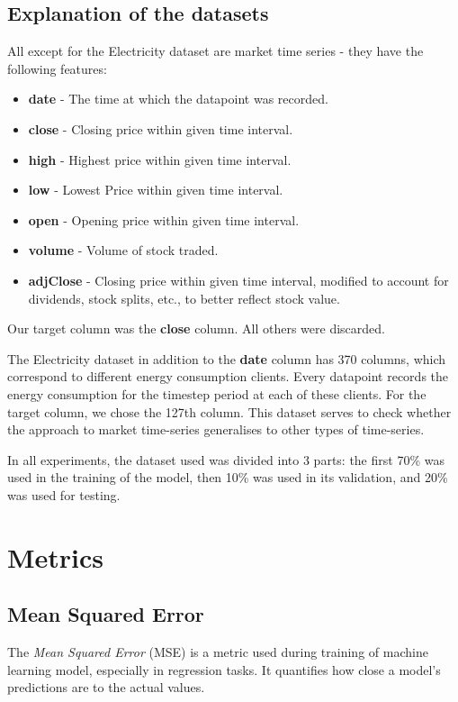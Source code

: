\subsection{Explanation of the datasets}
All except for the Electricity dataset are market time series - they have the following features:
\begin{itemize}
	\item \textbf{date} - The time at which the datapoint was recorded.
	\item \textbf{close} - Closing price within given time interval.
	\item \textbf{high} - Highest price within given time interval.
	\item \textbf{low} - Lowest Price within given time interval.
	\item \textbf{open} - Opening price within given time interval.
	\item \textbf{volume} - Volume of stock traded.
	\item \textbf{adjClose} - Closing price within given time interval, modified to account for dividends, stock splits, etc., to better reflect stock value.
\end{itemize}
Our target column was the \textbf{close} column. All others were discarded.


The Electricity dataset in addition to the \textbf{date} column has 370 columns, which correspond to different energy consumption clients. Every datapoint records the energy consumption for the timestep period at each of these clients. For the target column, we chose the 127th column.
This dataset serves to check whether the approach to market time-series generalises to other types of time-series.

In all experiments, the dataset used was divided into 3 parts: the first 70\% was used in the training of the model, then 10\% was used in its validation, and 20\% was used for testing.


\section{Metrics}

\subsection{Mean Squared Error}
The \emph{Mean Squared Error} (MSE) is a metric used during training of machine learning model, especially in regression tasks. It quantifies how close a model's predictions are to the actual values.


